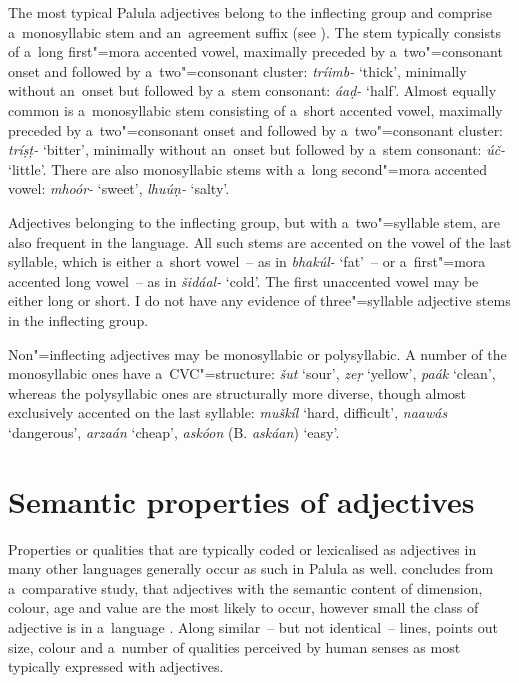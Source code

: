 The most typical Palula adjectives belong to the inflecting group and comprise a~monosyllabic stem and an~agreement suffix (see ). The stem typically consists of a~long first"=mora accented vowel, maximally preceded by a~two"=consonant onset and followed by a~two"=consonant cluster: \textit{tríimb-} `thick', minimally without an~onset but followed by a~stem consonant: \textit{áaḍ-} `half'. Almost equally common is a~monosyllabic stem consisting of a~short accented vowel, maximally preceded by a~two"=consonant onset and followed by a~two"=consonant cluster: \textit{tríṣṭ-} `bitter', minimally without an~onset but followed by a~stem consonant: \textit{úč-} `little'. There are also monosyllabic stems with a~long second"=mora accented vowel: \textit{mhoór-} `sweet', \textit{lhuúṇ-} `salty'. 


Adjectives belonging to the inflecting group, but with a~two"=syllable stem, are also frequent in the language. All such stems are accented on the vowel of the last syllable, which is either a~short vowel~-- as in \textit{bhakúl-} `fat'~-- or a~first"=mora accented long vowel~-- as in \textit{šidáal-} `cold'. The first unaccented vowel may be either long or short. I do not have any evidence of three"=syllable adjective stems in the inflecting group.


Non"=inflecting adjectives may be monosyllabic or polysyllabic. A number of the monosyllabic ones have a~CVC"=structure: \textit{šut} `sour', \textit{zeṛ} `yellow', \textit{paák} `clean', whereas the polysyllabic ones are structurally more diverse, though almost exclusively accented on the last syllable: \textit{muškíl} `hard, difficult', \textit{naawás} `dangerous', \textit{arzaán} `cheap', \textit{askóon} (B. \textit{askáan}) `easy'. 


\section{Semantic properties of adjectives}
\label{sec:6-2}

Properties or qualities that are typically coded or lexicalised as adjectives in many other languages generally occur as such in Palula as well. \citeauthor{dixon1982} concludes from a~comparative study, that adjectives with the semantic content of dimension, colour, age and value are the most likely to occur, however small the class of adjective is in a~language \citep[46]{dixon1982}. Along similar~-- but not identical~-- lines, \citet[82]{givon2001a} points out size, colour and a~number of qualities perceived by human senses as most typically expressed with adjectives. 



